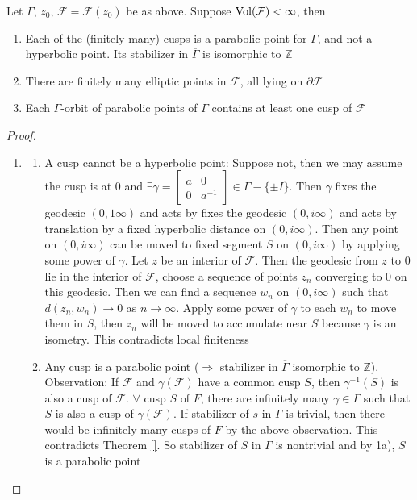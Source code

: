 \documentclass[main]{subfiles}
\begin{document}
\begin{theorem}
Let $\Gamma$, $z_0$, $\mathcal F=\mathcal F(z_0)$ be as above. Suppose $\operatorname{Vol}(\mathcal F)<\infty$, then
\begin{enumerate}
\item Each of the (finitely many) cusps is a parabolic point for $\Gamma$, and not a hyperbolic point. Its stabilizer in $\overline\Gamma$ is isomorphic to $\mathbb Z$
\item There are finitely many elliptic points in $\mathcal F$, all lying on $\partial \mathcal F$
\item Each $\Gamma$-orbit of parabolic points of $\Gamma$ contains at least one cusp of $\mathcal F$
\end{enumerate}
\end{theorem}

\begin{proof}
\begin{enumerate}[label=\roman*]
\item 
\begin{enumerate}[label=\alph*)]
\item A cusp cannot be a hyperbolic point: Suppose not, then we may assume the cusp is at 0 and $\exists\gamma=\begin{bmatrix}
a&0 \\
0& a^{-1}
\end{bmatrix}\in\Gamma-\{\pm I\}$. Then $\gamma$ fixes the geodesic $(0,1\infty)$ and acts by fixes the geodesic $(0,i\infty)$ and acts by translation by a fixed hyperbolic distance on $(0,i\infty)$. Then any point on $(0,i\infty)$ can be moved to fixed segment $S$ on $(0,i\infty)$ by applying some power of $\gamma$. Let $z$ be an interior of $\mathcal F$. Then the geodesic from $z$ to 0 lie in the interior of $\mathcal F$, choose a sequence of points $z_n$ converging to 0 on this geodesic. Then we can find a sequence $w_n$ on $(0,i\infty)$ such that $d(z_n,w_n)\to0$ as $n\to\infty$. Apply some power of $\gamma$ to each $w_n$ to move them in $S$, then $z_n$ will be moved to accumulate near $S$ because $\gamma$ is an isometry. This contradicts local finiteness
\item Any cusp is a parabolic point ($\Rightarrow$ stabilizer in $\overline\Gamma$ isomorphic to $\mathbb Z$). Observation: If $\mathcal F$ and $\gamma(\mathcal F)$ have a common cusp $S$, then $\gamma^{-1}(S)$ is also a cusp of $\mathcal F$. $\forall$ cusp $S$ of $F$, there are infinitely many $\gamma\in\Gamma$ such that $S$ is also  a cusp of $\gamma(\mathcal F)$. If stabilizer of $s$ in $\Gamma$ is trivial, then there would be infinitely many cusps of $F$ by the above observation. This contradicts Theorem \ref{}. So stabilizer of $S$ in $\overline\Gamma$ is nontrivial and by 1a), $S$ is a parabolic point

\end{enumerate}
\end{enumerate}
\end{proof}
\end{document}
